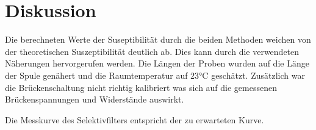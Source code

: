 \section{Diskussion}
\label{sec:Diskussion}
Die berechneten Werte der Suseptibilität durch die beiden Methoden weichen von der
theoretischen Suszeptibilität deutlich ab. Dies kann durch die verwendeten Näherungen hervorgerufen werden.
Die Längen der Proben wurden auf die Länge der Spule genähert und die Raumtemperatur auf $23$°C geschätzt.
Zusätzlich war die Brückenschaltung nicht richtig kalibriert was sich auf die gemessenen Brückenspannungen
und Widerstände auswirkt.

Die Messkurve des Selektivfilters entspricht der zu erwarteten Kurve.
